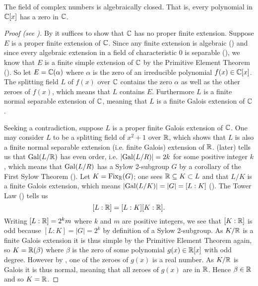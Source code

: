 \begin{theorem}\label{thrm-fundamental-theorem-of-algebra}
    The field of complex numbers is algebraically closed. That is, every polynomial in $\mathbb{C}[x]$ has a zero in $\mathbb{C}$.
\end{theorem}
\begin{proof}[Proof (see {\cite[Theorem 23.34]{judson_beezer_2022}})]
    By  it suffices to show that $\mathbb{C}$ has no proper finite extension. Suppose $E$ is a proper finite extension of $\mathbb{C}$. Since any finite extension is algebraic () and since every algebraic extension in a field of characteristic 0 is separable (), we know that $E$ is a finite simple extension of $\mathbb{C}$ by the Primitive Element Theorem (). So let $E = \mathbb{C}(\alpha)$ where $\alpha$ is the zero of an irreducible polynomial $f(x) \in \mathbb{C}[x]$. The splitting field $L$ of $f(x)$ over $\mathbb{C}$ contains the zero $\alpha$ as well as the other zeroes of $f(x)$, which means that $L$ contains $E$. Furthermore $L$ is a finite normal separable extension of $\mathbb{C}$, meaning that $L$ is a finite Galois extension of $\mathbb{C}$.

    Seeking a contradiction, suppose $L$ is a proper finite Galois extension of $\mathbb{C}$. One may consider $L$ to be a splitting field of $x^2 + 1$ over $\mathbb{R}$, which shows that $L$ is also a finite normal separable extension (i.e. finite Galois) extension of $\mathbb{R}$.  (later) tells us that $\mathrm{Gal}(L/\mathbb{R})$ has even order, i.e. $|\mathrm{Gal}(L/R)| = 2k$ for some positive integer $k$, which means that $\mathrm{Gal}(L/R)$ has a Sylow 2-subgroup $G$ by a corollary of the First Sylow Theorem (). Let $K = \mathrm{Fix}_{\mathbb{R}}(G)$; one sees $\mathbb{R} \subseteq K \subset L$ and that $L/K$ is a finite Galois extension, which means $|\mathrm{Gal}(L/K)| = |G| = [L:K]$ (). The Tower Law () tells us
    \[
        [L:\mathbb{R}] = [L:K][K:\mathbb{R}].
    \]
    Writing $[L:\mathbb{R}] = 2^km$ where $k$ and $m$ are positive integers, we see that $[K:\mathbb{R}]$ is odd because $[L:K] = |G| = 2^k$ by definition of a Sylow 2-subgroup. As $K/\mathbb{R}$ is a finite Galois extension it is thus simple by the Primitive Element Theorem again, so $K = \mathbb{R}(\beta)$ where $\beta$ is the zero of some polynomial $g(x) \in \mathbb{R}[x]$ with odd degree. However by , one of the zeroes of $g(x)$ is a real number. As $K/\mathbb{R}$ is Galois it is thus normal, meaning that all zeroes of $g(x)$ are in $\mathbb{R}$. Hence $\beta \in \mathbb{R}$ and so $K = \mathbb{R}$.


\end{proof}

